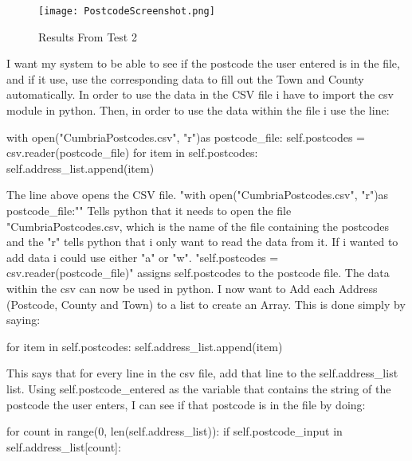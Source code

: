 \begin{figure}[H]
\caption{Results From Test 2} \label{fig:Results From Test 2}
\hfill\texttt{[image: PostcodeScreenshot.png]}\hspace*{\fill}
\end{figure}

I want my system to be able to see if the postcode the user entered is in the file, and if it use, use the corresponding data to fill out the Town and County automatically. In order to use the data in the CSV file i have to import the csv module in python. Then, in order to use the data within the file i use the line:

\begin{python}
with open("CumbriaPostcodes.csv", "r")as postcode_file:
                        self.postcodes = csv.reader(postcode_file)
                        for item in self.postcodes:
                                self.address_list.append(item)
\end{python}

The line above opens the CSV file. "with open("CumbriaPostcodes.csv", "r")as postcode_file:"" Tells python that it needs to open the file "CumbriaPostcodes.csv, which is the name of the file containing the postcodes and the "r" tells python that i only want to read the data from it. If i wanted to add data i could use either "a" or "w". "self.postcodes = csv.reader(postcode_file)" assigns self.postcodes to the postcode file. The data within the csv can now be used in python. I now want to Add each Address (Postcode, County and Town) to a list to create an Array. This is done simply by saying:
\begin{python}
 for item in self.postcodes:
                                self.address_list.append(item)
\end{python}

This says that for every line in the csv file, add that line to the self.address_list list. Using self.postcode_entered as the variable that contains the string of the postcode the user enters, I can see if that postcode is in the file by doing:
\begin{python}
for count in range(0, len(self.address_list)):
                                if self.postcode_input in self.address_list[count]:
\end{python}

